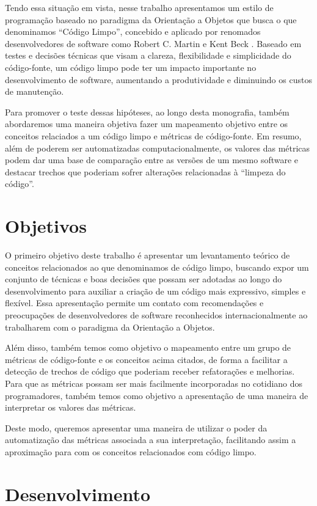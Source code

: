 Tendo essa situação em vista, nesse trabalho apresentamos um estilo de programação baseado
no paradigma da Orientação a Objetos que busca o que denominamos ``Código Limpo'', concebido e aplicado por renomados desenvolvedores de software
como Robert C. Martin \cite{} e Kent Beck \cite{}. Baseado em testes e decisões técnicas que visam a clareza, flexibilidade
e simplicidade do código-fonte, um código limpo pode ter um impacto importante no desenvolvimento 
de software, aumentando a produtividade e diminuindo os custos de manutenção.

Para promover o teste dessas hipóteses, ao longo desta monografia, também abordaremos uma maneira objetiva fazer um mapeamento objetivo 
entre os conceitos relaciados a um código limpo e métricas de código-fonte. Em resumo, além de poderem ser
automatizadas computacionalmente, os valores das métricas podem dar uma base de comparação entre
as versões de um mesmo software e destacar trechos que poderiam sofrer alterações relacionadas à ``limpeza do código''.

\section{Objetivos}
\label{sec:objetivo}


O primeiro objetivo deste trabalho é apresentar um levantamento teórico de conceitos relacionados ao que denominamos de 
código limpo, buscando expor um conjunto de técnicas e boas decisões que possam ser adotadas ao longo do 
desenvolvimento para auxiliar a criação de um código mais expressivo, simples e flexível. Essa apresentação permite um 
contato com recomendações e preocupações de desenvolvedores de software reconhecidos internacionalmente ao trabalharem com 
o paradigma da Orientação a Objetos.

Além disso, também temos como objetivo o mapeamento entre um grupo de métricas de código-fonte e os conceitos acima 
citados, de forma a facilitar a detecção de trechos de código que poderiam receber refatorações e melhorias. Para que as 
métricas possam ser mais facilmente incorporadas no cotidiano dos programadores, também temos como objetivo a apresentação 
de uma maneira de interpretar os valores das métricas.

Deste modo, queremos apresentar uma maneira de utilizar o poder da automatização das métricas associada a sua interpretação, facilitando assim 
a aproximação para com os conceitos relacionados com código limpo.

\section{Desenvolvimento}
\label{sec:desenvolvimento}

